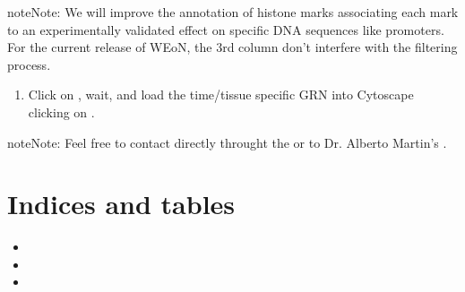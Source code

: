 \documentclass[letterpaper,10pt,english]{sphinxmanual}
\begin{document}
\begin{sphinxadmonition}{note}{Note:}
We will improve the annotation of histone marks associating each mark to an
experimentally validated effect on specific DNA sequences like promoters. For
the current release of WEoN, the 3rd column don’t interfere with the filtering
process.
\end{sphinxadmonition}
\begin{enumerate}
\def\theenumi{\arabic{enumi}}
\def\labelenumi{\theenumi .}
\makeatletter\def\p@enumii{\p@enumi \theenumi .}\makeatother
\setcounter{enumi}{3}
\item {} 

Click on , wait, and load the time/tissue specific GRN into Cytoscape
clicking on .

\end{enumerate}

\begin{sphinxadmonition}{note}{Note:}
Feel free to contact directly throught the 
or to Dr. Alberto Martin’s .
\end{sphinxadmonition}


\chapter{Indices and tables}
\label{\detokenize{index:indices-and-tables}}\begin{itemize}
\item {} 

\item {} 

\item {} 

\end{itemize}



\renewcommand{\indexname}{Index}
\printindex
\end{document}
